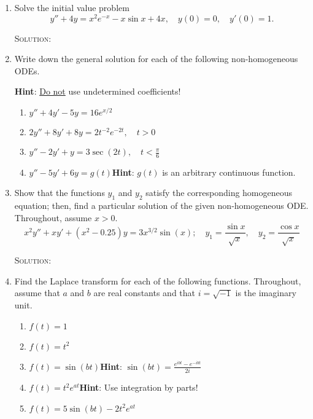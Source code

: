 \documentclass[12pt]{article}
\newcommand{\sol}{\par\vspace{4.5mm}\hspace{-4.5mm}\textsc{Solution:}}
\newcommand{\hint}[1]{\textbf{Hint}: #1}
\begin{document}
	\begin{enumerate}
		\item Solve the initial value problem
		\[y''+4y=x^2e^{-x}-x\sin{x}+4x,\quad y(0)=0,\quad y'(0)=1.\]
		\sol
		
		\newpage
		
		\item Write down the general solution for each of the following non-homogeneous ODEs. 
		
		\hint{\ul{Do not} use undetermined coefficients!}
		\begin{enumerate}[itemsep=2in]
			\item $y''+4y'-5y=16e^{x/2}$
			\item $2y''+8y'+8y=2t^{-2}e^{-2t},\quad t>0$
			\item $y''-2y'+y=3\sec(2t),\quad t<\frac{\pi}{6}$
			\item $y''-5y'+6y=g(t)$\quad\hint{$g(t)$ is an arbitrary continuous function.}
		\end{enumerate}
	
		\newpage
		
		\item Show that the functions $y_1$ and $y_2$ satisfy the corresponding homogeneous equation; then, find a particular solution of the given non-homogeneous ODE. Throughout, assume $x>0$.
		\[x^2y''+xy'+(x^2-0.25)y=3x^{3/2}\sin(x);\quad y_1=\frac{\sin{x}}{\sqrt{x}},\quad y_2=\frac{\cos{x}}{\sqrt{x}}\]
		\sol
		
		\newpage
		
		\item Find the Laplace transform for each of the following functions. Throughout, assume that $a$ and $b$ are real constants and that $i=\sqrt{-1}$ is the imaginary unit.
		\begin{enumerate}[itemsep=1.625in]
			\item $f(t)=1$
			\item $f(t)=t^2$
			\item $f(t)=\sin(b t)$\quad\hint{$\sin(bt)=\frac{e^{i b t}-e^{-i b t}}{2i}$}
			\item $f(t)=t^2 e^{a t}$\quad\hint{Use integration by parts!}
			\item $f(t)=5\sin(b t)-2t^2 e^{a t}$
		\end{enumerate}
		
	\end{enumerate}
\end{document}
